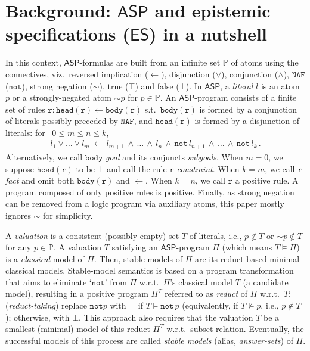 \documentclass[submission,copyright,creativecommons]{eptcs}
\newcommand{\classnot}  { {\sim} }
\newcommand{\Prop}  { \mathbb{P} }
\newcommand{\onequote}[1]  {`#1'}
\newcommand{\logic}[1]  { \ensuremath{\mathsf{#1}} }
\newcommand{\ASP}  { \logic{ASP} }
\newcommand{\ES}  { \logic{ES} }
\newcommand{\naf}  { \texttt{NAF} }
\newcommand{\lpnot}  { \mathtt{not} \, }
\newcommand{\notlp}  { \mathtt{not} }
\newcommand{\Body}  { \mathtt{body} }
\newcommand{\epispec}  { \Pi }
\begin{document}
\section{Background: \texorpdfstring{$\ASP$}{ASP} 
and epistemic specifications (\texorpdfstring{$\ES$}{ES}) in a nutshell}
\label{sec:background ASP and ES}
In this context, $\ASP$-formulas are built from an infinite set $\Prop$ of atoms 
using the connectives, viz.\ reversed implication ($\leftarrow$), disjunction ($\lor$), 
conjunction ($\land$), $\naf$ ($\notlp$), strong negation ($\classnot$), true ($\top$) and false ($\bot$). In $\ASP$,
a \emph{literal} $l$ is an atom $p$ or a strongly-negated atom $\classnot p$ 
for $p \in \Prop$. An $\ASP$-program consists of a finite set of rules $\mathtt{r} : \mathtt{head(r)} \leftarrow \mathtt{body(r)}$ s.t.\ $\mathtt{body(r)}$ is formed by a conjunction of literals possibly preceded by $\naf$, 
and $\mathtt{head(r)}$ is formed
by a disjunction of literals: for \, $0 \leq m \leq n \leq k$,
%
\begin{align}
\label{defn:ASP rules}
l_1 \lor  \ldots \lor l_m ~\leftarrow~ 
l_{m+1} \,\land \, \ldots \, \land \,  l_n \, \land \, \lpnot l_{n+1} \, 
\land \, \ldots \, \land \,\lpnot l_k \,. 
\end{align}%
%
Alternatively, we call $\Body$ \emph{goal} and its conjuncts \emph{subgoals}.
When $m=0$, we suppose $\mathtt{head(r)}$ to be $\bot$ and call the rule $\mathtt{r}$
\emph{constraint}. When $k=m$, we call $\mathtt{r}$ \emph{fact} and omit both
$\mathtt{body(r)}$ and $\leftarrow$. When $k=n$, we call $\mathtt{r}$ a positive rule. 
A program composed of only positive rules is positive. 
Finally, as strong negation can be removed from a logic program via auxiliary atoms, this paper mostly ignores $\classnot$ for simplicity.

A \emph{valuation} is a consistent (possibly empty) 
set $T$ of literals, i.e., $p \not\in T$ or $\classnot p \not\in T$ for any $p \in \Prop$. 
A valuation $T$ satisfying an $\ASP$-program $\epispec$ (which means $T \models \epispec$) is a \emph{classical} model of $\epispec$. 
Then, 
stable-models of $\epispec$ are 
its reduct-based minimal classical models.
Stable-model semantics is based on a program transformation
that aims to eliminate \onequote{$\notlp$}
from $\epispec$ w.r.t.\ $\epispec$'s 
classical model $T$ (a candidate model), 
resulting in a positive program $\epispec^T$ referred to as 
\emph{reduct} of $\epispec$ w.r.t.\ $T$:
(\emph{reduct-taking}) replace 
$\notlp p \text{ with } \top$ if $T \models \lpnot p$ 
(equivalently, if $T \not\models p$, i.e., $p \not\in T$);
otherwise, with $\bot$.
This approach also requires that the valuation $T$ be a smallest (minimal) 
model of this reduct $\epispec^T$ w.r.t.\ subset relation. Eventually,
the successful models of this process are called \emph{stable models}
(alias, \emph{answer-sets}) of $\epispec$.
\end{document}
